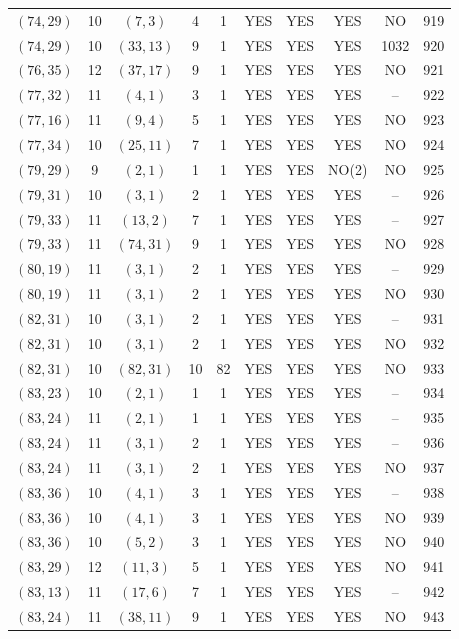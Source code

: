\begin{longtable}{|c|c|c|c|c|c|c|c|c|c|}
$(74, 29)$ & 10 & $(7, 3)$ & 4 & 1 & YES & YES & YES & NO & 919\\
$(74, 29)$ & 10 & $(33, 13)$ & 9 & 1 & YES & YES & YES & 1032 & 920\\
$(76, 35)$ & 12 & $(37, 17)$ & 9 & 1 & YES & YES & YES & NO & 921\\
$(77, 32)$ & 11 & $(4, 1)$ & 3 & 1 & YES & YES & YES & -- & 922\\
$(77, 16)$ & 11 & $(9, 4)$ & 5 & 1 & YES & YES & YES & NO & 923\\
$(77, 34)$ & 10 & $(25, 11)$ & 7 & 1 & YES & YES & YES & NO & 924\\
$(79, 29)$ & 9 & $(2, 1)$ & 1 & 1 & YES & YES & NO(2) & NO & 925\\
$(79, 31)$ & 10 & $(3, 1)$ & 2 & 1 & YES & YES & YES & -- & 926\\
$(79, 33)$ & 11 & $(13, 2)$ & 7 & 1 & YES & YES & YES & -- & 927\\
$(79, 33)$ & 11 & $(74, 31)$ & 9 & 1 & YES & YES & YES & NO & 928\\
$(80, 19)$ & 11 & $(3, 1)$ & 2 & 1 & YES & YES & YES & -- & 929\\
$(80, 19)$ & 11 & $(3, 1)$ & 2 & 1 & YES & YES & YES & NO & 930\\
$(82, 31)$ & 10 & $(3, 1)$ & 2 & 1 & YES & YES & YES & -- & 931\\
$(82, 31)$ & 10 & $(3, 1)$ & 2 & 1 & YES & YES & YES & NO & 932\\
$(82, 31)$ & 10 & $(82, 31)$ & 10 & 82 & YES & YES & YES & NO & 933\\
$(83, 23)$ & 10 & $(2, 1)$ & 1 & 1 & YES & YES & YES & -- & 934\\
$(83, 24)$ & 11 & $(2, 1)$ & 1 & 1 & YES & YES & YES & -- & 935\\
$(83, 24)$ & 11 & $(3, 1)$ & 2 & 1 & YES & YES & YES & -- & 936\\
$(83, 24)$ & 11 & $(3, 1)$ & 2 & 1 & YES & YES & YES & NO & 937\\
$(83, 36)$ & 10 & $(4, 1)$ & 3 & 1 & YES & YES & YES & -- & 938\\
$(83, 36)$ & 10 & $(4, 1)$ & 3 & 1 & YES & YES & YES & NO & 939\\
$(83, 36)$ & 10 & $(5, 2)$ & 3 & 1 & YES & YES & YES & NO & 940\\
$(83, 29)$ & 12 & $(11, 3)$ & 5 & 1 & YES & YES & YES & NO & 941\\
$(83, 13)$ & 11 & $(17, 6)$ & 7 & 1 & YES & YES & YES & -- & 942\\
$(83, 24)$ & 11 & $(38, 11)$ & 9 & 1 & YES & YES & YES & NO & 943\\

\end{longtable}
